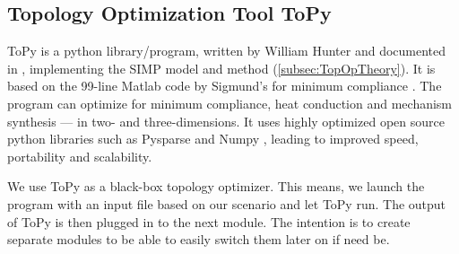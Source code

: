 \subsection{Topology Optimization Tool ToPy}
ToPy \cite{ToPy} is a python library/program, written by William Hunter and documented in \cite{Hunter2009}, implementing the SIMP model and method (\autoref{subsec:TopOpTheory}). It is based on the 99-line Matlab code by Sigmund's for minimum compliance \cite{sigmund200199}. The program can optimize for minimum compliance, heat conduction and mechanism synthesis --- in two- and three-dimensions. It uses highly optimized open source python libraries such as Pysparse \cite{Pysparse} and Numpy \cite{Numpy}, leading to improved speed, portability and scalability. %


We use ToPy as a black-box topology optimizer. This means, we launch the program with an input file based on our scenario and let ToPy run. The output of ToPy is then plugged in to the next module. The intention is to create separate modules to be able to easily switch them later on if need be.
